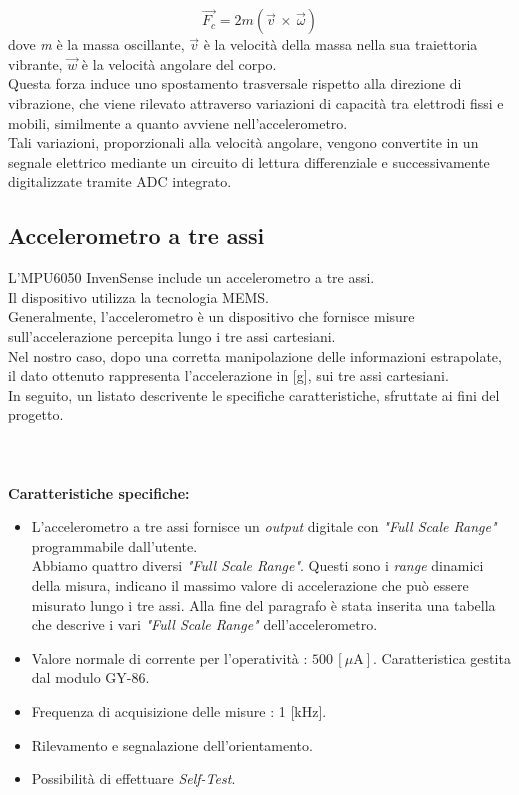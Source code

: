 \begin{equation}
    \vec{F_c} = 2m(\vec{v}\,\times \,\vec\omega )
\end{equation}
dove \textit{m} è la massa oscillante, $\vec{v}$ è la velocità della massa nella sua traiettoria vibrante, $\vec{w}$ è la velocità angolare del corpo.\\
Questa forza induce uno spostamento trasversale rispetto alla direzione di vibrazione, che viene rilevato attraverso variazioni di capacità tra elettrodi fissi e mobili, similmente a quanto avviene nell'accelerometro.\\
Tali variazioni, proporzionali alla velocità angolare, vengono convertite in un segnale elettrico mediante un circuito di lettura differenziale e successivamente digitalizzate tramite ADC integrato.
\subsection{Accelerometro a tre assi}
L'MPU6050 InvenSense include un accelerometro a tre assi.\\
Il dispositivo utilizza la tecnologia MEMS.\\
Generalmente, l'accelerometro è un dispositivo che fornisce misure sull'accelerazione percepita lungo i tre assi cartesiani.\\
Nel nostro caso, dopo una corretta manipolazione delle informazioni estrapolate, il dato ottenuto rappresenta l'accelerazione in [g], sui tre assi cartesiani.\\
In seguito, un listato descrivente le specifiche caratteristiche, sfruttate ai fini del progetto.\\\\\\\\
\textbf{Caratteristiche specifiche:}
\begin{itemize}
\item L'accelerometro a tre assi fornisce un \textit{output} digitale con \textit{"Full Scale Range"} programmabile dall'utente.\\ Abbiamo quattro diversi \textit{"Full Scale Range"}. Questi sono i \textit{range} dinamici della misura, indicano il massimo valore di accelerazione che può essere misurato lungo i tre assi. Alla fine del paragrafo è stata inserita una tabella che descrive i vari \textit{"Full Scale Range"} dell'accelerometro. 
\item Valore normale di corrente per l'operatività : $500\,[\mu\text{A}]$. Caratteristica gestita dal modulo GY-86.
\item Frequenza di acquisizione delle misure : 1 [kHz].
\item Rilevamento e segnalazione dell'orientamento.
\item Possibilità di effettuare \textit{Self-Test}.
\end{itemize}

